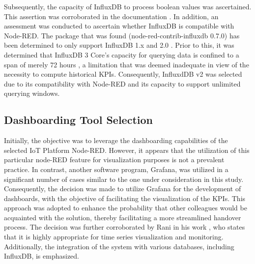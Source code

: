 {Subsequently, the capacity of InfluxDB to process boolean values was ascertained. This assertion was corroborated in the documentation \cite{WriteDataInfluxDB}. In addition, an assessment was conducted to ascertain whether InfluxDB is compatible with Node-RED. The package that was found (node-red-contrib-influxdb 0.7.0) has been determined to only support InfluxDB 1.x and 2.0 \cite{Noderedcontribinfluxdb}. Prior to this, it was determined that InfluxDB 3 Core's capacity for querying data is confined to a span of merely 72 hours \cite{QueryDataGet}, a limitation that was deemed inadequate in view of the necessity to compute historical KPIs. Consequently, InfluxdDB v2 was selected due to its compatibility with Node-RED and its capacity to support unlimited querying windows.

\subsection{Dashboarding Tool Selection}
Initially, the objective was to leverage the dashboarding capabilities of the selected IoT Platform Node-RED.
However, it appears that the utilization of this particular node-RED feature for visualization purposes is not a prevalent practice. In contrast, another software program, Grafana, was utilized in a significant number of cases similar to the one under consideration in this study. Consequently, the decision was made to utilize Grafana for the development of dashboards, with the objective of facilitating the visualization of the KPIs. This approach was adopted to enhance the probability that other colleagues would be acquainted with the solution, thereby facilitating a more streamlined handover process. The decision was further corroborated by Rani in his work \cite{raniToolsTechniquesRealtime2025}, who states that it is highly appropriate for time series visualization and monitoring. Additionally, the integration of the system with various databases, including InfluxDB, is emphasized.

}
